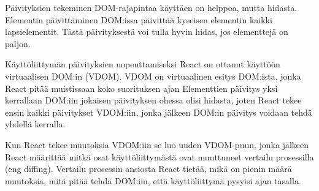 Päivityksien tekeminen DOM-rajapintaa käyttäen on helppoa, mutta hidasta.
Elementin päivittäminen DOM:issa päivittää kyseisen elementin kaikki lapsielementit. 
Tästä päivityksestä voi tulla hyvin hidas, jos elementtejä on paljon.
\bigskip




Käyttöliittymän päivityksien nopeuttamiseksi React on ottanut käyttöön virtuaalisen DOM:in (VDOM).
VDOM on virtuaalinen esitys DOM:ista, jonka React pitää muistissaan koko suorituksen ajan
Elementtien päivitys yksi kerrallaan DOM:iin jokaisen päivityksen ohessa olisi hidasta,
joten React tekee ensin kaikki päivitykset VDOM:iin, jonka jälkeen DOM:in päivitys voidaan tehdä yhdellä kerralla.
%
%
\medskip

Kun React tekee muutoksia VDOM:iin se luo uuden VDOM-puun, jonka jälkeen
React määrittää mitkä osat käyttöliittymästä ovat muuttuneet vertailu prosessilla (eng diffing).
Vertailu prosessin ansiosta React tietää, mikä on pienin määrä muutoksia, mitä pitää tehdä DOM:iin, 
että käyttöliittymä pysyisi ajan tasalla.
\medskip



